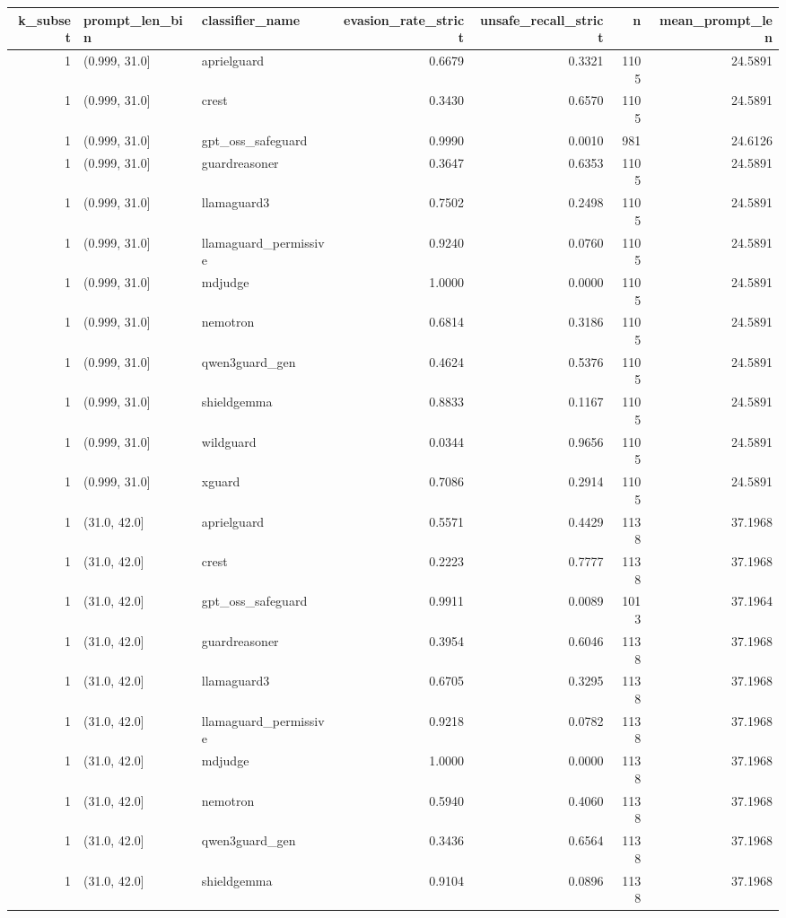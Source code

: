 \begin{tabular}{rllrrrr}
\toprule
k\_subset & prompt\_len\_bin & classifier\_name & evasion\_rate\_strict & unsafe\_recall\_strict & n & mean\_prompt\_len \\
\midrule
1 & (0.999, 31.0] & aprielguard & 0.6679 & 0.3321 & 1105 & 24.5891 \\
1 & (0.999, 31.0] & crest & 0.3430 & 0.6570 & 1105 & 24.5891 \\
1 & (0.999, 31.0] & gpt\_oss\_safeguard & 0.9990 & 0.0010 & 981 & 24.6126 \\
1 & (0.999, 31.0] & guardreasoner & 0.3647 & 0.6353 & 1105 & 24.5891 \\
1 & (0.999, 31.0] & llamaguard3 & 0.7502 & 0.2498 & 1105 & 24.5891 \\
1 & (0.999, 31.0] & llamaguard\_permissive & 0.9240 & 0.0760 & 1105 & 24.5891 \\
1 & (0.999, 31.0] & mdjudge & 1.0000 & 0.0000 & 1105 & 24.5891 \\
1 & (0.999, 31.0] & nemotron & 0.6814 & 0.3186 & 1105 & 24.5891 \\
1 & (0.999, 31.0] & qwen3guard\_gen & 0.4624 & 0.5376 & 1105 & 24.5891 \\
1 & (0.999, 31.0] & shieldgemma & 0.8833 & 0.1167 & 1105 & 24.5891 \\
1 & (0.999, 31.0] & wildguard & 0.0344 & 0.9656 & 1105 & 24.5891 \\
1 & (0.999, 31.0] & xguard & 0.7086 & 0.2914 & 1105 & 24.5891 \\
1 & (31.0, 42.0] & aprielguard & 0.5571 & 0.4429 & 1138 & 37.1968 \\
1 & (31.0, 42.0] & crest & 0.2223 & 0.7777 & 1138 & 37.1968 \\
1 & (31.0, 42.0] & gpt\_oss\_safeguard & 0.9911 & 0.0089 & 1013 & 37.1964 \\
1 & (31.0, 42.0] & guardreasoner & 0.3954 & 0.6046 & 1138 & 37.1968 \\
1 & (31.0, 42.0] & llamaguard3 & 0.6705 & 0.3295 & 1138 & 37.1968 \\
1 & (31.0, 42.0] & llamaguard\_permissive & 0.9218 & 0.0782 & 1138 & 37.1968 \\
1 & (31.0, 42.0] & mdjudge & 1.0000 & 0.0000 & 1138 & 37.1968 \\
1 & (31.0, 42.0] & nemotron & 0.5940 & 0.4060 & 1138 & 37.1968 \\
1 & (31.0, 42.0] & qwen3guard\_gen & 0.3436 & 0.6564 & 1138 & 37.1968 \\
1 & (31.0, 42.0] & shieldgemma & 0.9104 & 0.0896 & 1138 & 37.1968 \\

\end{tabular}
